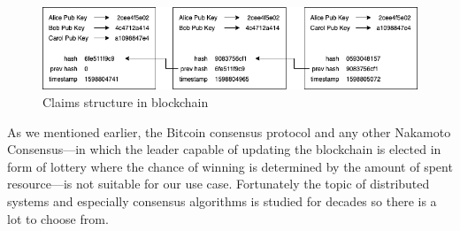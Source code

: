 \documentclass[nostrict]{szablonPG}
\begin{document}
\begin{figure}[h!]
\includegraphics[width=\textwidth]{img/claims-structure.png}
\centering
\caption{Claims structure in blockchain}
\label{fig:claims-structure}
\end{figure} 

As we mentioned earlier, the Bitcoin consensus protocol and any other Nakamoto Consensus––in which the leader capable of updating the blockchain is elected in form of lottery where the chance of winning is determined by the amount of spent resource––is not suitable for our use case. Fortunately the topic of distributed systems and especially consensus algorithms is studied for decades so there is a lot to choose from.
\end{document}
